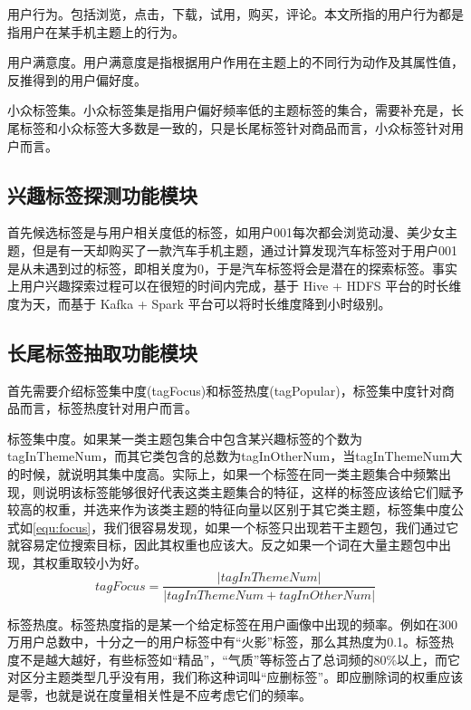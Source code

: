   用户行为。包括浏览，点击，下载，试用，购买，评论。本文所指的用户行为都是指用户在某手机主题上的行为。

  用户满意度。用户满意度是指根据用户作用在主题上的不同行为动作及其属性值，反推得到的用户偏好度。

  小众标签集。小众标签集是指用户偏好频率低的主题标签的集合，需要补充是，长尾标签和小众标签大多数是一致的，只是长尾标签针对商品而言，小众标签针对用户而言。

  \subsection{兴趣标签探测功能模块}
  首先候选标签是与用户相关度低的标签，如用户001每次都会浏览动漫、美少女主题，但是有一天却购买了一款汽车手机主题，通过计算发现汽车标签对于用户001是从未遇到过的标签，即相关度为0，于是汽车标签将会是潜在的探索标签。事实上用户兴趣探索过程可以在很短的时间内完成，基于 Hive + HDFS 平台的时长维度为天，而基于 Kafka + Spark 平台可以将时长维度降到小时级别。

  \subsection{长尾标签抽取功能模块}
  首先需要介绍标签集中度(tagFocus)和标签热度(tagPopular)，标签集中度针对商品而言，标签热度针对用户而言。

  标签集中度。如果某一类主题包集合中包含某兴趣标签的个数为tagInThemeNum，而其它类包含的总数为tagInOtherNum，当tagInThemeNum大的时候，就说明其集中度高。实际上，如果一个标签在同一类主题集合中频繁出现，则说明该标签能够很好代表这类主题集合的特征，这样的标签应该给它们赋予较高的权重，并选来作为该类主题的特征向量以区别于其它类主题，标签集中度公式如\autoref{equ:focus}，我们很容易发现，如果一个标签只出现若干主题包，我们通过它就容易定位搜索目标，因此其权重也应该大。反之如果一个词在大量主题包中出现，其权重取较小为好。
  \begin{equation}
    tagFocus=\frac{|tagInThemeNum|}{|tagInThemeNum+tagInOtherNum|}
    \label{equ:focus}
  \end{equation}

  标签热度。标签热度指的是某一个给定标签在用户画像中出现的频率。例如在300万用户总数中，十分之一的用户标签中有“火影”标签，那么其热度为0.1。标签热度不是越大越好，有些标签如“精品”，“气质”等标签占了总词频的80\%以上，而它对区分主题类型几乎没有用，我们称这种词叫“应删标签”。即应删除词的权重应该是零，也就是说在度量相关性是不应考虑它们的频率。

